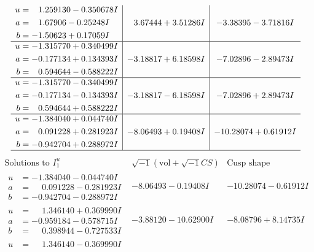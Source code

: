 \documentclass[1p]{elsarticle_modified}
\theoremstyle{definition}
\newcommand{\I}{\sqrt{-1}}
\begin{document}
$$\begin{array}{c|c|c}
\begin{aligned}
u &= \phantom{-}1.259130 - 0.350678 I \\
a &= \phantom{-}1.67906 - 0.25248 I \\
b &= -1.50623 + 0.17059 I\end{aligned}
 & \phantom{-}3.67444 + 3.51286 I & -3.38395 - 3.71816 I \\ \hline\begin{aligned}
u &= -1.315770 + 0.340499 I \\
a &= -0.177134 + 0.134393 I \\
b &= \phantom{-}0.594644 - 0.588222 I\end{aligned}
 & -3.18817 + 6.18598 I & -7.02896 - 2.89473 I \\ \hline\begin{aligned}
u &= -1.315770 - 0.340499 I \\
a &= -0.177134 - 0.134393 I \\
b &= \phantom{-}0.594644 + 0.588222 I\end{aligned}
 & -3.18817 - 6.18598 I & -7.02896 + 2.89473 I \\ \hline\begin{aligned}
u &= -1.384040 + 0.044740 I \\
a &= \phantom{-}0.091228 + 0.281923 I \\
b &= -0.942704 + 0.288972 I\end{aligned}
 & -8.06493 + 0.19408 I & -10.28074 + 0.61912 I\\
 \hline 
 \end{array}$$\newpage$$\begin{array}{c|c|c}  
\text{Solutions to }I^u_{1}& \I (\text{vol} + \sqrt{-1}CS) & \text{Cusp shape}\\
 \hline 
\begin{aligned}
u &= -1.384040 - 0.044740 I \\
a &= \phantom{-}0.091228 - 0.281923 I \\
b &= -0.942704 - 0.288972 I\end{aligned}
 & -8.06493 - 0.19408 I & -10.28074 - 0.61912 I \\ \hline\begin{aligned}
u &= \phantom{-}1.346140 + 0.369990 I \\
a &= -0.959184 - 0.578715 I \\
b &= \phantom{-}0.398944 - 0.727533 I\end{aligned}
 & -3.88120 - 10.62900 I & -8.08796 + 8.14735 I \\ \hline\begin{aligned}
u &= \phantom{-}1.346140 - 0.369990 I \\

\end{aligned}
\end{array}$$
\end{document}
